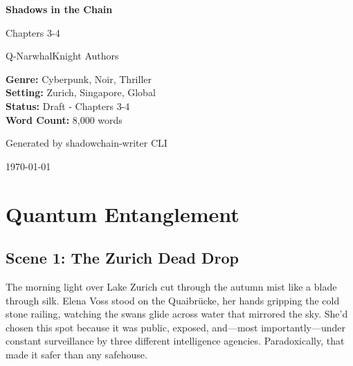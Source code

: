\documentclass[12pt,oneside]{book}
\begin{document}
\begin{titlepage}
\centering
\vspace*{2cm}

{\Huge\bfseries\color{neongreen} Shadows in the Chain \par}
\vspace{0.5cm}
{\LARGE\color{neonblue} Chapters 3-4 \par}
\vspace{1.5cm}

{\Large\color{neonblue} Q-NarwhalKnight Authors \par}
\vspace{2cm}

{\color{darkbg}
\begin{tcolorbox}[colback=darkbg,colframe=neonblue,arc=0pt,outer arc=0pt]
\color{neongreen}\textbf{Genre:} Cyberpunk, Noir, Thriller\\
\color{neongreen}\textbf{Setting:} Zurich, Singapore, Global\\
\color{neongreen}\textbf{Status:} Draft - Chapters 3-4\\
\color{neongreen}\textbf{Word Count:} 8,000 words
\end{tcolorbox}
}

\vfill
{\large\color{matrixgreen} Generated by shadowchain-writer CLI \par}
{\color{neonblue} \today \par}

\end{titlepage}

\newpage
\tableofcontents
\newpage

\chapter{Quantum Entanglement}

\section*{Scene 1: The Zurich Dead Drop}

The morning light over Lake Zurich cut through the autumn mist like a blade through silk. Elena Voss stood on the Quaibrücke, her hands gripping the cold stone railing, watching the swans glide across water that mirrored the sky. She'd chosen this spot because it was public, exposed, and—most importantly—under constant surveillance by three different intelligence agencies. Paradoxically, that made it safer than any safehouse.
\end{document}
